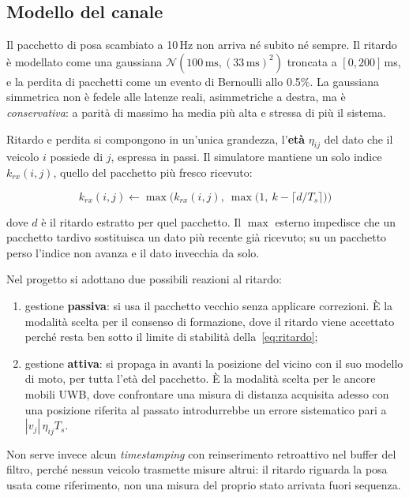 \documentclass[conference,9pt]{IEEEtran}
\begin{document}
\subsection{Modello del canale}

Il pacchetto di posa scambiato a 10\,Hz non arriva n\'e subito n\'e sempre. Il
ritardo \`e modellato come una gaussiana $\mathcal{N}(100\,\mathrm{ms},
(33\,\mathrm{ms})^2)$ troncata a $[0, 200]$\,ms, e la perdita di pacchetti come
un evento di Bernoulli allo 0.5\%. La gaussiana simmetrica non \`e fedele alle
latenze reali, asimmetriche a destra, ma \`e \emph{conservativa}: a parit\`a di
massimo ha media pi\`u alta e stressa di pi\`u il sistema.

Ritardo e perdita si compongono in un'unica grandezza, l'\textbf{et\`a} $\eta_{ij}$ del dato che il veicolo $i$ possiede di
$j$, espressa in passi. Il simulatore mantiene un solo indice $k_{rx}(i,j)$,
quello del pacchetto pi\`u fresco ricevuto:

\begin{equation}
k_{rx}(i,j) \gets \max\Big(k_{rx}(i,j),\ \max\big(1,\ k - \lceil d/T_s \rceil\big)\Big)
\label{eq:krx}
\end{equation}

dove $d$ \`e il ritardo estratto per quel pacchetto. Il $\max$ esterno impedisce
che un pacchetto tardivo sostituisca un dato pi\`u recente gi\`a ricevuto; su
un pacchetto perso l'indice non avanza e il dato invecchia da solo.

Nel progetto si adottano due possibili reazioni al ritardo:
\begin{enumerate}
\item gestione \textbf{passiva}: si usa il pacchetto vecchio senza applicare
      correzioni. \`E la modalit\`a scelta per il consenso di formazione, dove
      il ritardo viene accettato perch\'e resta ben sotto il limite di
      stabilit\`a della~\eqref{eq:ritardo};
\item gestione \textbf{attiva}: si propaga in avanti la posizione del vicino con
      il suo modello di moto, per tutta l'et\`a del pacchetto. \`E la modalit\`a
      scelta per le ancore mobili UWB, dove confrontare una misura di distanza
      acquisita adesso con una posizione riferita al passato introdurrebbe un
      errore sistematico pari a $|v_j|\,\eta_{ij} T_s$.
\end{enumerate}

Non serve invece alcun \emph{timestamping} con reinserimento retroattivo nel
buffer del filtro, perch\'e nessun veicolo trasmette misure altrui: il ritardo
riguarda la posa usata come riferimento, non una misura del proprio stato
arrivata fuori sequenza.
\end{document}
